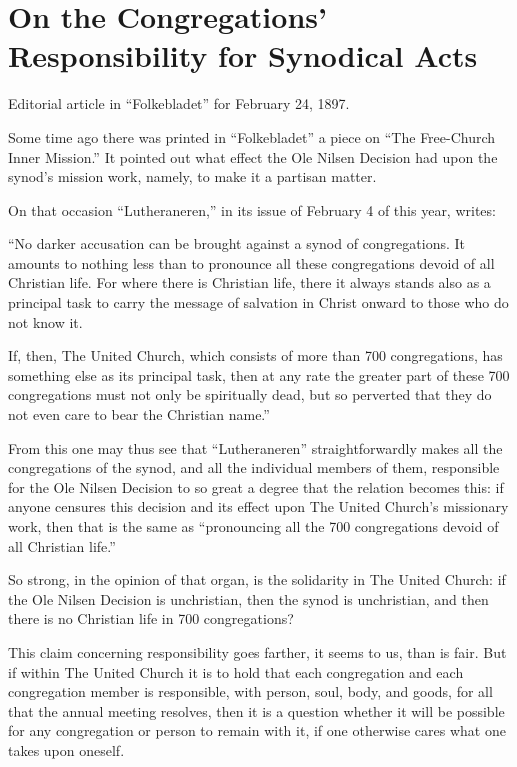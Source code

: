 
\section{On the Congregations’ Responsibility for Synodical Acts}

Editorial article in “Folkebladet” for February 24, 1897.

Some time ago there was printed in “Folkebladet” a piece on “The Free-Church Inner Mission.” It pointed out what effect the Ole Nilsen Decision had upon the synod’s mission work, namely, to make it a partisan matter.

On that occasion “Lutheraneren,” in its issue of February 4 of this year, writes:

“No darker accusation can be brought against a synod of congregations. It amounts to nothing less than to pronounce all these congregations devoid of all Christian life. For where there is Christian life, there it always stands also as a principal task to carry the message of salvation in Christ onward to those who do not know it.

If, then, The United Church, which consists of more than 700 congregations, has something else as its principal task, then at any rate the greater part of these 700 congregations must not only be spiritually dead, but so perverted that they do not even care to bear the Christian name.”

From this one may thus see that “Lutheraneren” straightforwardly makes all the congregations of the synod, and all the individual members of them, responsible for the Ole Nilsen Decision to so great a degree that the relation becomes this: if anyone censures this decision and its effect upon The United Church’s missionary work, then that is the same as “pronouncing all the 700 congregations devoid of all Christian life.”

So strong, in the opinion of that organ, is the solidarity in The United Church: if the Ole Nilsen Decision is unchristian, then the synod is unchristian, and then there is no Christian life in 700 congregations?

This claim concerning responsibility goes farther, it seems to us, than is fair. But if within The United Church it is to hold that each congregation and each congregation member is responsible, with person, soul, body, and goods, for all that the annual meeting resolves, then it is a question whether it will be possible for any congregation or person to remain with it, if one otherwise cares what one takes upon oneself.

